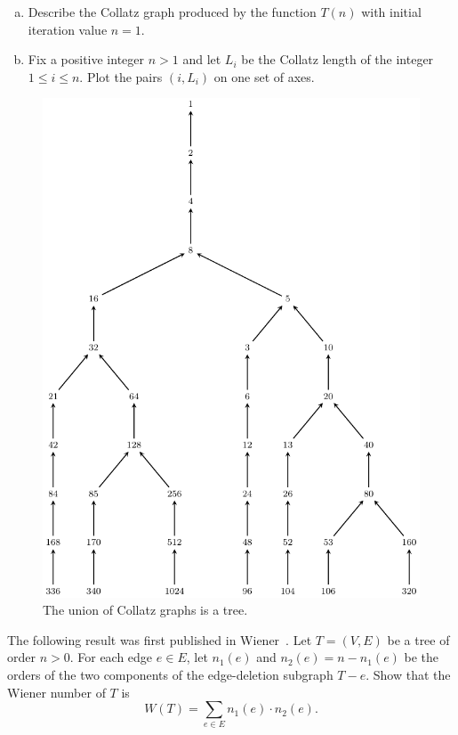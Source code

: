 \begin{problem}
\begin{enumerate}[(a)]
  \item Describe the Collatz graph produced by
    the function $T(n)$ with initial iteration value $n = 1$.

  \item Fix a positive integer $n > 1$ and let $L_i$ be the Collatz
    length of the integer $1 \leq i \leq n$. Plot the pairs $(i, L_i)$
    on one set of axes.
  \end{enumerate}

\begin{figure}[!htbp]
\centering
{}
\includegraphics{image/trees-forests/collatz-graph-union}
\caption{The union of Collatz graphs is a tree.}
\label{fig:trees_forests:Collatz_graph_union}
\end{figure}

\item The following result was first published in
  Wiener~\cite{Wiener1947}. Let $T = (V,E)$ be a
  tree of order $n > 0$. For each edge $e \in E$, let $n_1(e)$ and
  $n_2(e) = n - n_1(e)$ be the orders of the two components of the
  edge-deletion subgraph $T - e$. Show
  that the Wiener number of $T$ is
  \[
  W(T)
  =
  \sum_{e \in E} n_1(e) \cdot n_2(e).
  \]


\end{problem}
